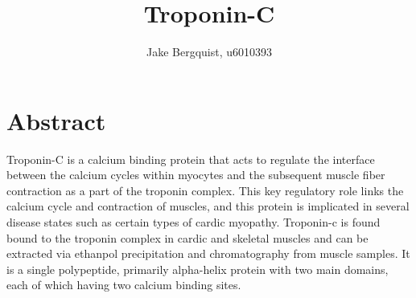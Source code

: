 \documentclass[12pt]{article}
\begin{document}
	
	\title{Troponin-C }
	\author{Jake Bergquist, u6010393 }
	\maketitle
	
	\section{Abstract}
	Troponin-C is a calcium binding protein that acts to regulate the interface between the calcium cycles within myocytes and the subsequent muscle fiber contraction as a part of the troponin complex. This key regulatory role links the calcium cycle and contraction of muscles, and this protein is implicated in several disease states such as certain types of cardic myopathy. Troponin-c is found bound to the troponin complex in cardic and skeletal muscles and can be extracted via ethanpol precipitation and chromatography from muscle samples. It is a single polypeptide, primarily alpha-helix protein with two main domains, each of which having two calcium binding sites. 
	
\end{document}
